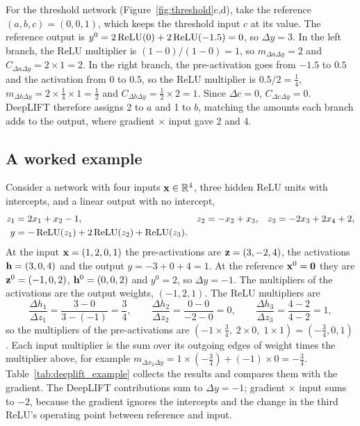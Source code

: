 For the threshold network (Figure~\ref{fig:threshold}c,d), take the reference $(a,b,c)=(0,0,1)$, which keeps the threshold input $c$ at its value. The reference output is $y^0=2\operatorname{ReLU}(0)+2\operatorname{ReLU}(-1.5)=0$, so $\Delta y=3$. In the left branch, the ReLU multiplier is $(1-0)/(1-0)=1$, so $m_{\Delta a\Delta y}=2$ and $C_{\Delta a\Delta y}=2\times 1=2$. In the right branch, the pre-activation goes from $-1.5$ to $0.5$ and the activation from $0$ to $0.5$, so the ReLU multiplier is $0.5/2=\frac14$, $m_{\Delta b\Delta y}=2\times\frac14\times 1=\frac12$ and $C_{\Delta b\Delta y}=\frac12\times 2=1$. Since $\Delta c=0$, $C_{\Delta c\Delta y}=0$. DeepLIFT therefore assigns 2 to $a$ and 1 to $b$, matching the amounts each branch adds to the output, where gradient $\times$ input gave 2 and 4.

\subsection{A worked example}
\label{sec:deeplift_example}

Consider a network with four inputs $\mathbf{x}\in\mathbb{R}^4$, three hidden ReLU units with intercepts, and a linear output with no intercept,
\begin{equation}
  \begin{aligned}
    z_1 &= 2x_1 + x_2 - 1, & z_2 &= -x_2 + x_3, & z_3 &= -2x_3 + 2x_4 + 2,\\
    y &= -\operatorname{ReLU}(z_1) + 2\operatorname{ReLU}(z_2) + \operatorname{ReLU}(z_3). & & & &
  \end{aligned}
  \label{eq:ex1_net}
\end{equation}
At the input $\mathbf{x}=(1,2,0,1)$ the pre-activations are $\mathbf{z}=(3,-2,4)$, the activations $\mathbf{h}=(3,0,4)$ and the output $y=-3+0+4=1$. At the reference $\mathbf{x}^0=\mathbf{0}$ they are $\mathbf{z}^0=(-1,0,2)$, $\mathbf{h}^0=(0,0,2)$ and $y^0=2$, so $\Delta y=-1$. The multipliers of the activations are the output weights, $(-1,2,1)$. The ReLU multipliers are
\begin{equation}
  \frac{\Delta h_1}{\Delta z_1}=\frac{3-0}{3-(-1)}=\frac34, \qquad
  \frac{\Delta h_2}{\Delta z_2}=\frac{0-0}{-2-0}=0, \qquad
  \frac{\Delta h_3}{\Delta z_3}=\frac{4-2}{4-2}=1,
\end{equation}
so the multipliers of the pre-activations are $(-1\times\frac34,\;2\times 0,\;1\times 1)=(-\frac34,0,1)$. Each input multiplier is the sum over its outgoing edges of weight times the multiplier above, for example $m_{\Delta x_2\Delta y}=1\times(-\frac34)+(-1)\times 0=-\frac34$. Table~\ref{tab:deeplift_example} collects the results and compares them with the gradient. The DeepLIFT contributions sum to $\Delta y=-1$; gradient $\times$ input sums to $-2$, because the gradient ignores the intercepts and the change in the third ReLU's operating point between reference and input.

